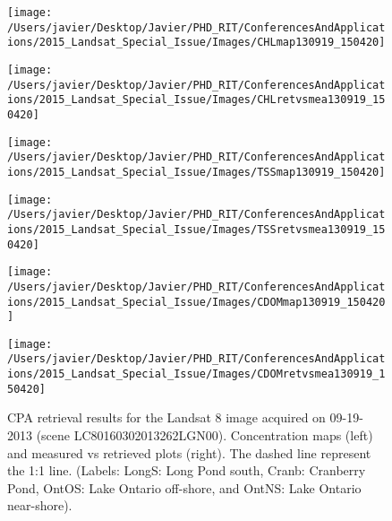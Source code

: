 \begin{figure}[htbp!]
  \begin{minipage}[c]{0.55\linewidth}
      \centering
      \texttt{[image: /Users/javier/Desktop/Javier/PHD\_RIT/ConferencesAndApplications/2015\_Landsat\_Special\_Issue/Images/CHLmap130919\_150420]}  
  \end{minipage}
  \hfill
  \begin{minipage}[d]{0.35\linewidth}
      \texttt{[image: /Users/javier/Desktop/Javier/PHD\_RIT/ConferencesAndApplications/2015\_Landsat\_Special\_Issue/Images/CHLretvsmea130919\_150420]}
  \end{minipage}
% 
  \begin{minipage}[c]{0.55\linewidth}
      \centering
      \texttt{[image: /Users/javier/Desktop/Javier/PHD\_RIT/ConferencesAndApplications/2015\_Landsat\_Special\_Issue/Images/TSSmap130919\_150420]}  
  \end{minipage}
  \hfill
  \begin{minipage}[d]{0.35\linewidth}
      \texttt{[image: /Users/javier/Desktop/Javier/PHD\_RIT/ConferencesAndApplications/2015\_Landsat\_Special\_Issue/Images/TSSretvsmea130919\_150420]}
  \end{minipage}

  \begin{minipage}[c]{0.55\linewidth}
      \centering
      \texttt{[image: /Users/javier/Desktop/Javier/PHD\_RIT/ConferencesAndApplications/2015\_Landsat\_Special\_Issue/Images/CDOMmap130919\_150420]}  
  \end{minipage}
  \hfill
  \begin{minipage}[d]{0.35\linewidth}
      \texttt{[image: /Users/javier/Desktop/Javier/PHD\_RIT/ConferencesAndApplications/2015\_Landsat\_Special\_Issue/Images/CDOMretvsmea130919\_150420]}
  \end{minipage}
% 
  \caption{CPA retrieval results for the Landsat 8 image acquired on 09-19-2013 (scene LC80160302013262LGN00). Concentration maps (left) and measured vs retrieved plots (right). The dashed line represent the 1:1 line. (Labels: LongS: Long Pond south, Cranb: Cranberry Pond, OntOS: Lake Ontario off-shore, and OntNS: Lake Ontario near-shore). \label{fig:CPAsMaps130919} } 
\end{figure}


